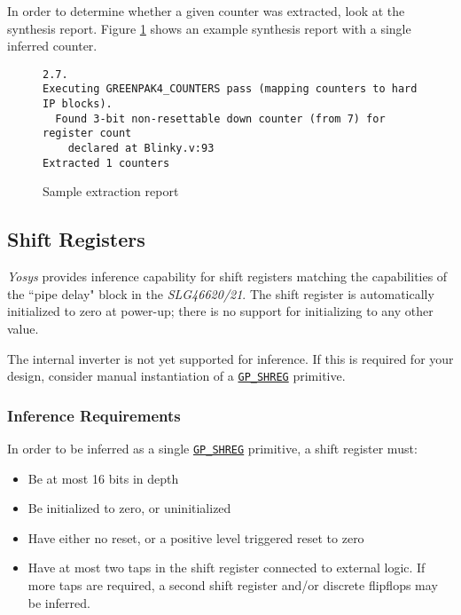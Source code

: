 \documentclass[11pt]{article}
\newcommand{\namestyle}[1]{\textit{#1}}
\newcommand{\tokenstyle}[1]{\texttt{#1}}
\newcommand{\tokenref}[2]{\hyperref[#2]{\tokenstyle{#1}}}
\begin{document}
In order to determine whether a given counter was extracted, look at the synthesis report. Figure
\ref{counter-extraction} shows an example synthesis report with a single inferred counter.

\begin{figure}[h]
{\small
\begin{verbatim}
2.7.
Executing GREENPAK4_COUNTERS pass (mapping counters to hard IP blocks).
  Found 3-bit non-resettable down counter (from 7) for register count
    declared at Blinky.v:93
Extracted 1 counters
\end{verbatim}
}
\caption{Sample extraction report}
\label{counter-extraction}
\end{figure}


\pagebreak
\subsection{Shift Registers}

\namestyle{Yosys} provides inference capability for shift registers matching the capabilities of the ``pipe delay" block in the
\namestyle{SLG46620/21}. The shift register is automatically initialized to zero at power-up; there is no support for initializing
to any other value.

The internal inverter is not yet supported for inference. If this is required for your design, consider manual
instantiation of a \tokenref{GP\_SHREG}{gp-shreg} primitive.

\subsubsection{Inference Requirements}

In order to be inferred as a single \tokenref{GP\_SHREG}{gp-shreg} primitive, a shift register must:

\begin{itemize}
\item Be at most 16 bits in depth
\item Be initialized to zero, or uninitialized
\item Have either no reset, or a positive level triggered reset to zero
\item Have at most two taps in the shift register connected to external logic. If more taps are required, a second
shift register and/or discrete flipflops may be inferred.
\end{itemize}
\end{document}
